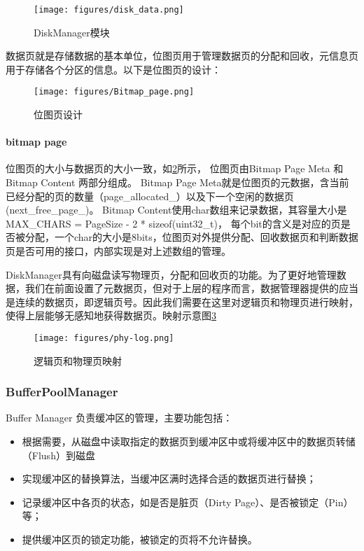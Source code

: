 \documentclass[12pt,hyperref,a4paper,UTF8]{ctexart}
\begin{document}
\begin{figure}[!h]
    \centering
    \texttt{[image: figures/disk\_data.png]}
    \caption{DiskManager模块}
    \label{fig2}
\end{figure}

数据页就是存储数据的基本单位，位图页用于管理数据页的分配和回收，元信息页用于存储各个分区的信息。以下是位图页的设计：

\begin{figure}[!h]
    \centering
    \texttt{[image: figures/Bitmap\_page.png]}
    \caption{位图页设计}
    \label{fig:bitmap}
\end{figure}

\paragraph{bitmap page}
位图页的大小与数据页的大小一致，如\ref{fig:bitmap}所示，
位图页由Bitmap Page Meta 和 Bitmap Content 两部分组成。
Bitmap Page Meta就是位图页的元数据，含当前已经分配的页的数量（page\_allocated\_）以及下一个空闲的数据页(next\_free\_page\_)。
Bitmap Content使用char数组来记录数据，其容量大小是 MAX\_CHARS = PageSize - 2 * sizeof(uint32\_t)，
每个bit的含义是对应的页是否被分配，一个char的大小是8bits，位图页对外提供分配、回收数据页和判断数据页是否可用的接口，内部实现是对上述数组的管理。

DiskManager具有向磁盘读写物理页，分配和回收页的功能。为了更好地管理数据，我们在前面设置了元数据页，但对于上层的程序而言，数据管理器提供的应当是连续的数据页，即逻辑页号。因此我们需要在这里对逻辑页和物理页进行映射，使得上层能够无感知地获得数据页。映射示意图\ref{fig:phy-log}

\begin{figure}[!ht]
    \centering
    \texttt{[image: figures/phy-log.png]}
    \caption{逻辑页和物理页映射}
    \label{fig:phy-log}
\end{figure}

\subsubsection{BufferPoolManager}

Buffer Manager 负责缓冲区的管理，主要功能包括：
\begin{itemize}
    \item 根据需要，从磁盘中读取指定的数据页到缓冲区中或将缓冲区中的数据页转储（Flush）到磁盘
    \item 实现缓冲区的替换算法，当缓冲区满时选择合适的数据页进行替换；
    \item 记录缓冲区中各页的状态，如是否是脏页（Dirty Page）、是否被锁定（Pin）等；
    \item 提供缓冲区页的锁定功能，被锁定的页将不允许替换。
\end{itemize}
\end{document}
